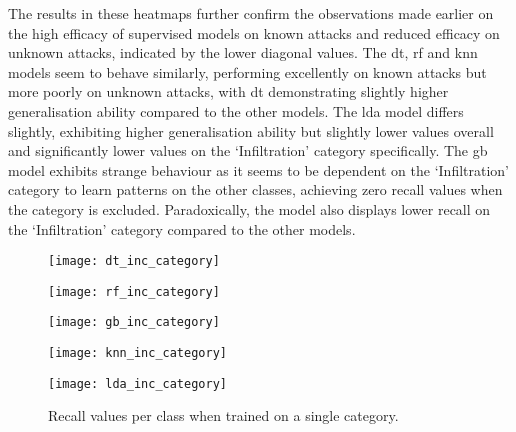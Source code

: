 The results in these heatmaps further confirm the observations made earlier on
the high efficacy of supervised models on known attacks and reduced efficacy on
unknown attacks, indicated by the lower diagonal values. The \gls{dt}, \gls{rf}
and \gls{knn} models seem to behave similarly, performing excellently on known
attacks but more poorly on unknown attacks, with \gls{dt} demonstrating
slightly higher generalisation ability compared to the other models. The
\gls{lda} model differs slightly, exhibiting higher generalisation ability but
slightly lower values overall and significantly lower values on the
`Infiltration' category specifically. The \gls{gb} model exhibits strange
behaviour as it seems to be dependent on the `Infiltration' category to learn
patterns on the other classes, achieving zero recall values when the category
is excluded. Paradoxically, the model also displays lower recall on the
`Infiltration' category compared to the other models.
%
\begin{figure}[htbp]
    \centering
    \begin{minipage}[h]{0.5\textwidth}
        \centering
        \texttt{[image: dt\_inc\_category]}
    \end{minipage}\hfill
    \begin{minipage}[h]{0.5\textwidth}
        \centering
        \texttt{[image: rf\_inc\_category]}
    \end{minipage}
    \begin{minipage}[h]{0.5\textwidth}
        \centering
        \texttt{[image: gb\_inc\_category]}
    \end{minipage}\hfill
    \begin{minipage}[h]{0.5\textwidth}
        \centering
        \texttt{[image: knn\_inc\_category]}
    \end{minipage}
    \begin{minipage}[h]{0.5\textwidth}
        \centering
        \texttt{[image: lda\_inc\_category]}
    \end{minipage}
    \caption[Single Category Results]{Recall values per class when trained on a single category.\label{fig:inc_cat}}
\end{figure}

